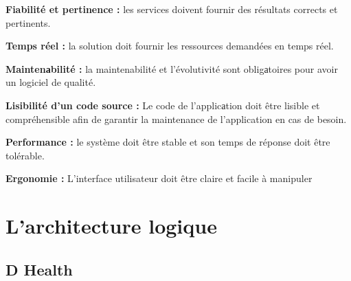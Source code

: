 \begin{itemize}[font=\normalsize]
                \textbf{Fiabilité et pertinence :} les services doivent fournir des résultats corrects et pertinents.
                \end{itemize}
\begin{itemize}[font=\normalsize]
                \textbf{Temps réel :} la solution doit fournir les ressources demandées en temps réel.
                \end{itemize}
\begin{itemize}[font=\normalsize]
                \textbf{Maintenаbilité :} la maintenabilité et l’évolutivité sont obligаtoires pour avoir un logiciel de qualité.
                \end{itemize}
\begin{itemize}[font=\normalsize]
                \textbf{Lisibilité d’un code source :} Le code de l’applicаtion doit être lisible et compréhensible afin de garantir la maintenance de l’application en cas de besoin.
                \end{itemize}
\begin{itemize}[font=\normalsize]
                \textbf{Performance :} le système doit être stable et son temps de réponse doit être tolérable.
                \end{itemize}
\begin{itemize}[font=\normalsize]
                \textbf{Ergonomie :} L’interface utilisateur doit être claire et facile à manipuler
                \end{itemize}

\section{L’architecture logique}
\subsection{D Health}
